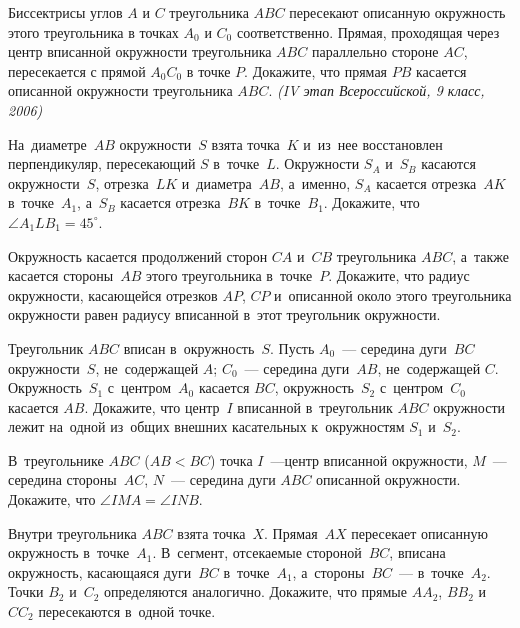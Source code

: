 \begin{problems}
\item
Биссектрисы углов $A$ и $C$ треугольника $ABC$ пересекают описанную окружность
этого треугольника в точках $A_0$ и $C_0$ соответственно.
Прямая, проходящая через центр вписанной окружности треугольника $ABC$
параллельно стороне $AC$, пересекается с прямой $A_0C_0$ в точке $P$.
Докажите, что прямая $PB$ касается описанной окружности треугольника $ABC$.
\emph{(IV этап Всероссийской, 9 класс, 2006)}

\item
На~диаметре~$AB$ окружности~$S$ взята точка~$K$ и~из~нее восстановлен
перпендикуляр, пересекающий $S$ в~точке~$L$.
Окружности $S_{A}$ и~$S_{B}$ касаются окружности~$S$, отрезка~$LK$
и~диаметра~$AB$, а~именно, $S_{A}$ касается отрезка~$AK$ в~точке~$A_{1}$,
а~$S_{B}$ касается отрезка~$BK$ в~точке~$B_{1}$.
Докажите, что $\angle A_{1}LB_{1} = 45^{\circ}$.

\item
Окружность касается продолжений сторон $CA$ и~$CB$ треугольника $ABC$, а~также
касается стороны~$AB$ этого треугольника в~точке~$P$.
Докажите, что радиус окружности, касающейся отрезков $AP$, $CP$ и~описанной
около этого треугольника окружности равен радиусу вписанной в~этот треугольник
окружности.

\item
Треугольник $ABC$ вписан в~окружность~$S$.
Пусть $A_{0}$~--- середина дуги~$BC$ окружности~$S$, не~содержащей $A$;
$C_{0}$~--- середина дуги~$AB$, не~содержащей $C$.
Окружность~$S_{1}$ с~центром~$A_{0}$ касается $BC$,
окружность~$S_{2}$ с~центром~$C_{0}$ касается $AB$.
Докажите, что центр~$I$ вписанной в~треугольник $ABC$ окружности лежит на~одной
из~общих внешних касательных к~окружностям $S_{1}$ и~$S_{2}$.

\item
В~треугольнике $ABC$ ($AB < BC$) точка $I$~---центр вписанной окружности,
$M$~--- середина стороны~$AC$, $N$~--- середина дуги $ABC$ описанной
окружности.
Докажите, что $\angle{IMA} = \angle{INB}$.

\item
Внутри треугольника $ABC$ взята точка~$X$.
Прямая~$AX$ пересекает описанную окружность в~точке~$A_{1}$.
В~сегмент, отсекаемые стороной~$BC$, вписана окружность, касающаяся дуги~$BC$
в~точке~$A_{1}$, а~стороны~$BC$~--- в~точке~$A_{2}$.
Точки $B_{2}$ и~$C_{2}$ определяются аналогично.
Докажите, что прямые $AA_{2}$, $BB_{2}$ и~$CC_{2}$ пересекаются в~одной точке.


\end{problems}
